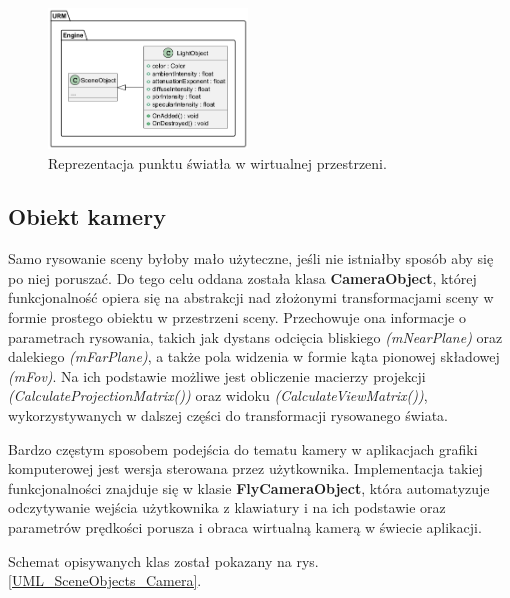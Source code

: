 	\begin{figure}[h!]
		\centering
		\includegraphics[width=200px]{images/UML/sceneobjects_light.png}
		\caption{Reprezentacja punktu światła w wirtualnej przestrzeni.}
		\label{UML_SceneObjects_Light}
	\end{figure}
	
\subsection{Obiekt kamery}
	Samo rysowanie sceny byłoby mało użyteczne, jeśli nie istniałby sposób aby się po niej poruszać. Do tego celu oddana została klasa \textbf{CameraObject}, której funkcjonalność opiera się na abstrakcji nad złożonymi transformacjami sceny w formie prostego obiektu w przestrzeni sceny. Przechowuje ona informacje o parametrach rysowania, takich jak dystans odcięcia bliskiego \textit{(mNearPlane)} oraz dalekiego \textit{(mFarPlane)}, a także pola widzenia w formie kąta pionowej składowej \textit{(mFov)}. Na ich podstawie możliwe jest obliczenie macierzy projekcji \textit{(CalculateProjectionMatrix())} oraz widoku \textit{(CalculateViewMatrix())}, wykorzystywanych w dalszej części do transformacji rysowanego świata.
	
	Bardzo częstym sposobem podejścia do tematu kamery w aplikacjach grafiki komputerowej jest wersja sterowana przez użytkownika. Implementacja takiej funkcjonalności znajduje się w klasie \textbf{FlyCameraObject}, która automatyzuje odczytywanie wejścia użytkownika z klawiatury i na ich podstawie oraz parametrów prędkości porusza i obraca wirtualną kamerą w świecie aplikacji.
	
	Schemat opisywanych klas został pokazany na rys. \ref{UML_SceneObjects_Camera}.
	
